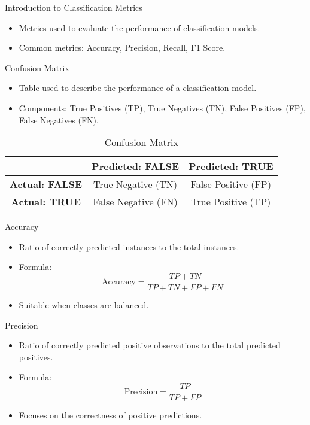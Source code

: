 \begin{frame}{Introduction to Classification Metrics}
    \begin{itemize}
        \item Metrics used to evaluate the performance of classification models.
        \item Common metrics: Accuracy, Precision, Recall, F1 Score.
    \end{itemize}
\end{frame}

\begin{frame}{Confusion Matrix}
    \begin{itemize}
        \item Table used to describe the performance of a classification model.
        \item Components: True Positives (TP), True Negatives (TN), False Positives (FP), False Negatives (FN).
    \end{itemize}

    \begin{table}[h!]
    \centering
    \begin{tabular}{|c|c|c|}
        \hline
        & \textbf{Predicted: FALSE} & \textbf{Predicted: TRUE} \\
        \hline
        \textbf{Actual: FALSE} & True Negative (TN) & False Positive (FP) \\
        \hline
        \textbf{Actual: TRUE} & False Negative (FN) & True Positive (TP) \\
        \hline
    \end{tabular}
    \caption{Confusion Matrix}
    \label{tab:confusion_matrix}
\end{table}
\end{frame}


\begin{frame}{Accuracy}
    \begin{itemize}
        \item Ratio of correctly predicted instances to the total instances.
        \item Formula:
        \[
        \text{Accuracy} = \frac{TP + TN}{TP + TN + FP + FN}
        \]
        \item Suitable when classes are balanced.
    \end{itemize}
\end{frame}

\begin{frame}{Precision}
    \begin{itemize}
        \item Ratio of correctly predicted positive observations to the total predicted positives.
        \item Formula:
        \[
        \text{Precision} = \frac{TP}{TP + FP}
        \]
        \item Focuses on the correctness of positive predictions.
    \end{itemize}
\end{frame}

